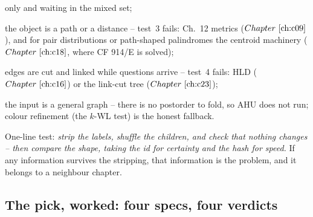 \begin{recognitionbox}
{        only and waiting in the mixed set;
  \item the object is a path or a distance -- test~3 fails: Ch.~12 metrics
        (\(\chref{c09}\)), and for pair distributions or path-shaped palindromes the
        centroid machinery (\(\chref{c18}\), where CF 914/E is solved);
  \item edges are cut and linked while questions arrive -- test~4 fails: HLD
        (\(\chref{c16}\)) or the link-cut tree (\(\chref{c23}\));
  \item the input is a general graph -- there is no postorder to fold, so AHU does
        not run; colour refinement (the \(k\)-WL test) is the honest fallback.
}
One-line test: \emph{strip the labels, shuffle the children, and check that nothing
changes -- then compare the shape, taking the id for certainty and the hash for
speed.}  If any information survives the stripping, that information is the problem,
and it belongs to a neighbour chapter.
\end{recognitionbox}

\subsection{The pick, worked: four specs, four verdicts}

